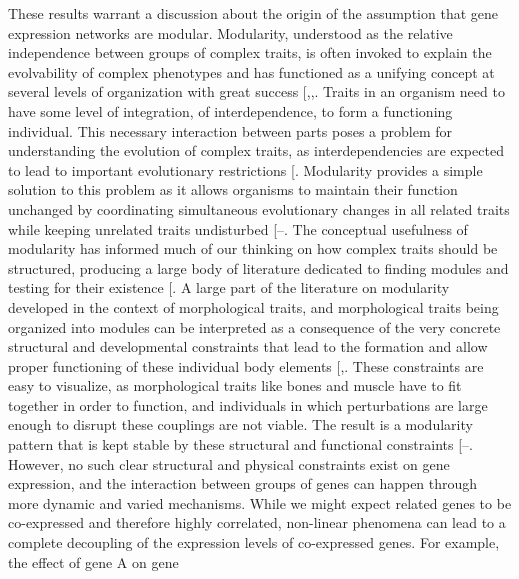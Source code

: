 \documentclass[
]{article}
\begin{document}
These results warrant a discussion about the origin of the assumption
that gene expression networks are modular. Modularity, understood as the
relative independence between groups of complex traits, is often invoked
to explain the evolvability of complex phenotypes and has functioned as
a unifying concept at several levels of organization with great success
{[},,\citeproc{ref-Zelditch2021-ue}{47}{]}.
Traits in an organism need to have some level of integration, of
interdependence, to form a functioning individual. This necessary
interaction between parts poses a problem for understanding the
evolution of complex traits, as interdependencies are expected to lead
to important evolutionary restrictions
{[}\citeproc{ref-Orr2000-gn}{48}{]}. Modularity provides a simple
solution to this problem as it allows organisms to maintain their
function unchanged by coordinating simultaneous evolutionary changes in
all related traits while keeping unrelated traits undisturbed
{[}--\citeproc{ref-Wagner1996-ui}{52}{]}.
The conceptual usefulness of modularity has informed much of our
thinking on how complex traits should be structured, producing a large
body of literature dedicated to finding modules and testing for their
existence {[}\citeproc{ref-Esteve-Altava2017-ws}{53}{]}. A large part of
the literature on modularity developed in the context of morphological
traits, and morphological traits being organized into modules can be
interpreted as a consequence of the very concrete structural and
developmental constraints that lead to the formation and allow proper
functioning of these individual body elements
{[},\citeproc{ref-Marcucio2011-nq}{55}{]}.
These constraints are easy to visualize, as morphological traits like
bones and muscle have to fit together in order to function, and
individuals in which perturbations are large enough to disrupt these
couplings are not viable. The result is a modularity pattern that is
kept stable by these structural and functional constraints
{[}--\citeproc{ref-Porto2009-pi}{58}{]}.
However, no such clear structural and physical constraints exist on gene
expression, and the interaction between groups of genes can happen
through more dynamic and varied mechanisms. While we might expect
related genes to be co-expressed and therefore highly correlated,
non-linear phenomena can lead to a complete decoupling of the expression
levels of co-expressed genes. For example, the effect of gene A on gene
\end{document}
